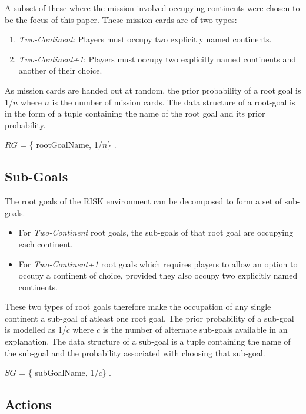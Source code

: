 \documentclass[parskip]{cs4rep}
\begin{document}
A subset of these where the mission involved occupying continents were chosen to be the focus of this paper. These mission cards are of two types:

\begin{enumerate}
\item
\textit{Two-Continent}: Players must occupy two explicitly named continents.
\item
\textit{Two-Continent+1}: Players must occupy two explicitly named continents and another of their choice.
\end{enumerate}

As mission cards are handed out at random, the prior probability of a root goal is 1/$n$ where $n$ is the number of mission cards. The data structure of a root-goal is in the form of a tuple containing the name of the root goal and its prior probability.

\centerline{
 $RG$ = \{ rootGoalName, 1/$n$\} .
}

\subsection{Sub-Goals}

The root goals of the RISK environment can be decomposed to form a set of sub-goals. 

\begin{itemize}
\item
For \textit{Two-Continent} root goals, the sub-goals of that root goal are occupying each continent. 
\item
For \textit{Two-Continent+1} root goals which requires players to allow an option to occupy a continent of choice, provided they also occupy two explicitly named continents. 
\end{itemize}

These two types of root goals therefore make the occupation of any single continent a sub-goal of atleast one root goal. The prior probability of a sub-goal is modelled as 1/$c$ where $c$ is the number of alternate sub-goals available in an explanation. The data structure of a sub-goal is a tuple containing the name of the sub-goal and the probability associated with choosing that sub-goal.\newline

\centerline{
 $SG$ = \{ subGoalName, 1/$c$\} .
}

\subsection{Actions}
\end{document}
